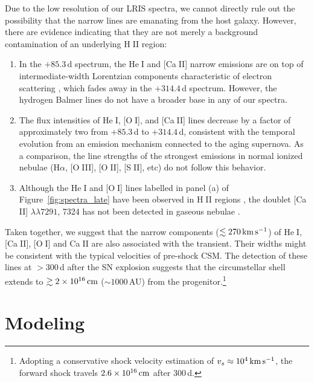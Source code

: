\documentclass[twocolumn]{aastex63}
\def\ion#1#2{#1$\;${\footnotesize\rm{#2}}\relax}
\begin{document}
Due to the low resolution of our LRIS spectra, we cannot directly rule out the possibility that the 
narrow lines are emanating from the host galaxy. However, there are evidence indicating that they are 
not merely a background contamination of an underlying \ion{H}{II} region: 
\begin{enumerate}[label=(\roman*)]
	\item In the $+85.3$\,d spectrum, the \ion{He}{I} and [\ion{Ca}{II}] narrow emissions are on top of 
	intermediate-width Lorentzian components characteristic of electron scattering \citep{Huang2018}, 
	which fades away in the $+314.4$\,d spectrum. However, the hydrogen Balmer lines do not have a 
	broader base in any of our spectra.
	\item The flux intensities of \ion{He}{I}, [\ion{O}{I}], and [\ion{Ca}{II}] lines decrease by a 
	factor of approximately two from $+85.3$\,d to $+314.4$\,d, consistent with the temporal 
	evolution from an emission mechanism connected to the aging supernova. As a comparison, the line 
	strengths  of the strongest emissions in normal ionized nebulae (H$\alpha$, [\ion{O}{III}], 
	[\ion{O}{II}], [\ion{S}{II}], etc) do not follow this behavior.
\item Although the \ion{He}{I} and [\ion{O}{I}] lines labelled in panel (a) of Figure~\ref{fig:spectra_late} 
have been observed in \ion{H}{II} regions \citep{Peimbert2000, Peimbert2017}, the doublet [\ion{Ca}{II}] 
$\lambda \lambda 7291$, 7324 has not been detected in gaseous nebulae \citep{Kingdon1995}.
\end{enumerate}

Taken together, we suggest that the narrow components ($\lesssim 270\,{\rm km\,s^{-1}}$) of 
\ion{He}{I}, [\ion{Ca}{II}], [\ion{O}{I}] and \ion{Ca}{II} are also associated with the transient. Their widths 
might be consistent with the typical velocities of pre-shock CSM. The detection of these lines at 
$>300$\,d after the SN explosion suggests that the circumstellar shell extends to $\gtrsim 2\times 
10^{16}\,{\rm cm}$ ($\sim 1000$\,AU) from the progenitor.\footnote{Adopting a conservative shock 
velocity estimation of 
	$v_s\approx10^4\,{\rm km\,s^{-1}}$, the forward shock travels $2.6\times 10^{16}\,{\rm cm}$ after 
	300\,d.}


\section{Modeling} \label{sec:modelling}
\end{document}
